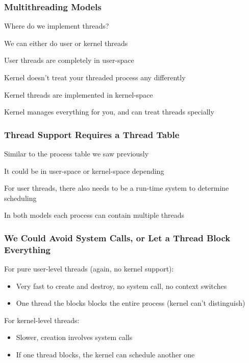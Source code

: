   \begin{frame}
    \frametitle{Multithreading Models}

    Where do we implement threads?

    \hspace{2em} We can either do user or kernel threads

    \vspace{2em}

    User threads are completely in user-space

    \hspace{2em} Kernel doesn't treat your threaded process any differently

    \vspace{2em}

    Kernel threads are implemented in kernel-space

    \hspace{2em} Kernel manages everything for you, and can treat threads specially
  \end{frame}

  \begin{frame}
    \frametitle{Thread Support Requires a Thread Table}

    Similar to the process table we saw previously

    \hspace{2em} It could be in user-space or kernel-space depending

    \vspace{2em}

    For user threads, there also needs to be a run-time system to determine
    scheduling

    \vspace{2em}

    In both models each process can contain multiple threads
  \end{frame}

  \begin{frame}
    \frametitle{We Could Avoid System Calls, or Let a Thread Block Everything}

    For pure user-level threads (again, no kernel support):

    \begin{itemize}
      \item Very fast to create and destroy, no system call, no context switches
      \item One thread the blocks blocks the entire process (kernel can't distinguish)
    \end{itemize}

    \vspace{2em}

    For kernel-level threads:

    \begin{itemize}
      \item Slower, creation involves system calls
      \item If one thread blocks, the kernel can schedule another one
    \end{itemize}
  \end{frame}

